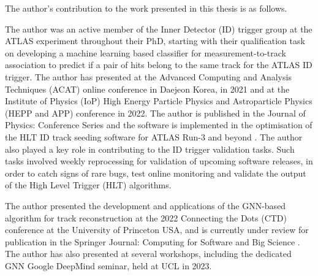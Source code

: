 The author’s contribution to the work presented in this thesis is as follows.

The author was an active member of the Inner Detector (ID) trigger group at the ATLAS experiment throughout their PhD, starting with their qualification task on developing a machine learning based classifier for measurement-to-track association to predict if a pair of hits belong to the same track for the ATLAS ID trigger. The author has presented at the Advanced Computing and Analysis Techniques (ACAT) online conference in Daejeon Korea, in 2021 and at the Institute of Physics (IoP) High Energy Particle Physics and Astroparticle Physics (HEPP and APP) conference in 2022. The author is published in the Journal of Physics: Conference Series \cite{Lad_2023} and the software is implemented in the optimisation of the HLT ID track seeding software for ATLAS Run-3 and beyond \cite{Grandi:2728111, Long:2813981}. The author also played a key role in contributing to the ID trigger validation tasks. Such tasks involved weekly reprocessing for validation of upcoming software releases, in order to catch signs of rare bugs, test online monitoring and validate the output of the High Level Trigger (HLT) algorithms.

The author presented the development and applications of the GNN-based algorithm for track reconstruction at the 2022 Connecting the Dots (CTD) conference at the University of Princeton USA, and is currently under review for publication in the Springer Journal: Computing for Software and Big Science \cite{Lad_2023_gnn}. The author has also presented at several workshops, including the dedicated GNN Google DeepMind seminar, held at UCL in 2023.


